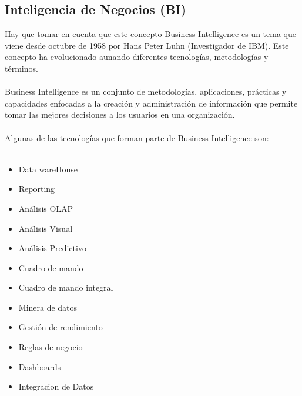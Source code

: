 \documentclass[preprint,12pt]{elsarticle}
\begin{document}
	\subsection{Inteligencia de Negocios (BI)}
	Hay que tomar en cuenta que este concepto Business Intelligence es un tema que viene desde octubre de 1958 
por Hans Peter Luhn (Investigador de IBM). Este concepto ha evolucionado aunando diferentes tecnologías, metodologías
 y términos.\cite{referenciarobles1}
\\
\\
Business Intelligence  es un conjunto de metodologías, aplicaciones, prácticas y capacidades enfocadas a la creación
 y administración de información que permite tomar las mejores decisiones a los usuarios en una organización.
\\
\\
Algunas de las tecnologías que forman parte de Business Intelligence son:
\\
\\
	\begin{itemize}
	\item Data wareHouse 
	\item Reporting 
	\item Análisis OLAP
	\item Análisis Visual
	\item Análisis Predictivo 
	\item Cuadro de mando
	\item Cuadro de mando integral
	\item Minera de datos 
	\item Gestión de rendimiento
	\item Reglas de negocio
	\item Dashboards 
	\item Integracion de Datos
	\end{itemize}



\end{document}
